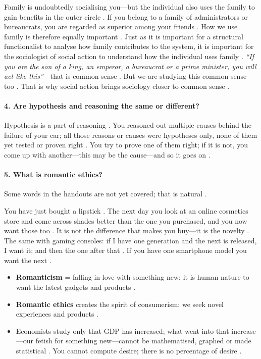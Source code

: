 \begin{ExampleBox}
Family is undoubtedly socialising you---but the individual also uses the family to gain benefits in the outer circle . If you belong to a family of administrators or bureaucrats, you are regarded as superior among your friends . How we use family is therefore equally important . Just as it is important for a structural functionalist to analyse how family contributes to the system, it is important for the sociologist of social action to understand how the individual uses family . \textit{``If you are the son of a king, an emperor, a bureaucrat or a prime minister, you will act like this''}---that is common sense . But we are studying this common sense too . That is why social action brings sociology closer to common sense .
\end{ExampleBox}

\paragraph{4. Are hypothesis and reasoning the same or different?}
Hypothesis is a part of reasoning . You reasoned out multiple causes behind the failure of your car; all those reasons or causes were hypotheses only, none of them yet tested or proven right . You try to prove one of them right; if it is not, you come up with another---this may be the cause---and so it goes on .

\paragraph{5. What is romantic ethics?}
Some words in the handouts are not yet covered; that is natural .

\begin{ExampleBox}
You have just bought a lipstick . The next day you look at an online cosmetics store and come across shades better than the one you purchased, and you now want those too . It is not the difference that makes you buy---it is the novelty . The same with gaming consoles: if I have one generation and the next is released, I want it; and then the one after that . If you have one smartphone model you want the next .
\end{ExampleBox}

\begin{KeyConcept}
\begin{itemize}
    \item \textbf{Romanticism} = falling in love with something new; it is human nature to want the latest gadgets and products .
    \item \textbf{Romantic ethics} creates the spirit of consumerism: we seek novel experiences and products .
    \item Economists study only that GDP has increased; what went into that increase---our fetish for something new---cannot be mathematised, graphed or made statistical . You cannot compute desire; there is no percentage of desire .
\end{itemize}
\end{KeyConcept}

